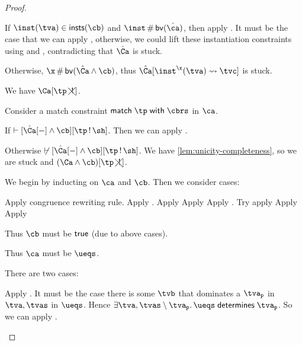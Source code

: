 \documentclass[acmsmall,screen,nonacm%
\Anonymous{,anonymous}{}%
\Final{}{,review}%
]{acmart}
\begin{document}
\begin{proof}
\begin{proofcases}
\begin{proofcases}
\begin{proofcases}
      If $\inst(\tv) \in \insts \cb$ and $\inst \disjoint \bvs {\hat\ca}$, then apply .
	    It must be the case that we can apply , otherwise, we could lift these instantiation
	    constraints using  and , contradicting that $\hat\Ca$ is stuck.

	    Otherwise, $\x \disjoint \bvs {\hat \Ca \cand \cb}$, thus $\hat\Ca\where{\cpapp \x \tv \tvc \inst}$ is stuck.

	  \proofcase{$\hat\Ca\where{\cmatch \tp \cbrs}$}
	    We have $\nCshape \Ca \tp$.

	    Consider a match constraint $\cmatch \tp \cbrs$ in $\ca$.

      If $\th \Cshape {\where{\hat\Ca\where{-} \cand \cb}} \tp \sh$. Then we can apply .

      Otherwise $\not \th \Cshape {\where{\hat\Ca\where{-} \cand \cb}} \tp \sh$. We have \cref{lem:unicity-completeness},
      so we are stuck and $\nCshape {(\Ca \cand \cb)} \tp$.
	\end{proofcases}

    \end{proofcases}

    \proofcase{$\cletr \x \tv \tvs \ca \cb$}
    We begin by inducting on $\ca$ and $\cb$. Then we consider cases:
    \begin{proofcases}
       Apply congruence rewriting rule.
       Apply .
       Apply 
       Apply 
       Apply .
       Try apply 
       Apply 
       Apply 

	Thus $\cb$ must be $\mathsf{true}$ (due to above cases).
	\begin{proofcases}
	    Thus $\ca$ must be $\ueqs$.

	    There are two cases:
	    \begin{itemize}
	      \proofcase{$\cexists {\tv, \tvs} \ueqs \cequiv \ctrue$} Apply .
	      \proofcase{$\cexists {\tv, \tvs} \ueqs \cnequiv \ctrue$} It must be the case there is some $\tvb$ that dominates a $\tvp$ in $\tv, \tvs$ in $\ueqs$.
		Hence $\cdetermines {\cexists {\tv, \tvs \setminus \tvp} \ueqs} \tvp$.
		So we can apply .
	    \end{itemize}


\end{proofcases}
\end{proofcases}
\end{proofcases}
\end{proof}
\end{document}
